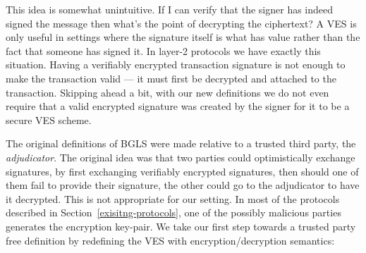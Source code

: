 \documentclass[fullpage]{article}
\theoremstyle{definition}
\begin{document}
This idea is somewhat unintuitive. If I can verify that the signer has indeed signed the message then what's the point of decrypting the ciphertext? A VES is only useful in settings where the signature itself is what has value rather than the fact that someone has signed it. In layer-2 protocols we have exactly this situation. Having a verifiably encrypted transaction signature is not enough to make the transaction valid --- it must first be decrypted and attached to the transaction. Skipping ahead a bit, with our new definitions we do not even require that a valid encrypted signature was created by the signer for it to be a secure VES scheme.

The original definitions of BGLS were made relative to a trusted third party, the \emph{adjudicator}. The original idea was that two parties could optimistically exchange signatures, by  first exchanging verifiably encrypted signatures, then should one of them fail to provide their signature, the other could go to the adjudicator to have it decrypted. This is not appropriate for our setting. In most of the protocols described in Section~\ref{exisitng-protocols}, one of the possibly malicious parties generates the encryption key-pair. We take our first step towards a trusted party free definition by redefining the VES with encryption/decryption semantics:

\newcommand{\rightsample}{\hskip2.3pt{\mbox{\tiny${\$}$\normalsize}}\!\!\rightarrow\,}
\end{document}
